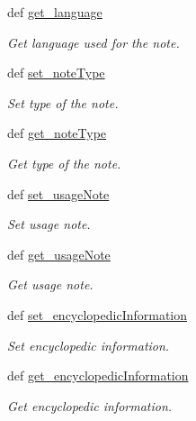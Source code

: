 \begin{DoxyCompactItemize}
def \hyperlink{classlmf_1_1src_1_1core_1_1statement_1_1_statement_aaa72b5537d3c61a7b4da16b83d99a947}{get\+\_\+language}
\begin{DoxyCompactList}\small\item\em Get language used for the note. \end{DoxyCompactList}\item 
def \hyperlink{classlmf_1_1src_1_1core_1_1statement_1_1_statement_a496622deaffb5533321e305c99ef4689}{set\+\_\+note\+Type}
\begin{DoxyCompactList}\small\item\em Set type of the note. \end{DoxyCompactList}\item 
def \hyperlink{classlmf_1_1src_1_1core_1_1statement_1_1_statement_a3d7c298b233b33d30ede48fb9c447a4c}{get\+\_\+note\+Type}
\begin{DoxyCompactList}\small\item\em Get type of the note. \end{DoxyCompactList}\item 
def \hyperlink{classlmf_1_1src_1_1core_1_1statement_1_1_statement_a457b19a604578033bd13ab3d4007ba2e}{set\+\_\+usage\+Note}
\begin{DoxyCompactList}\small\item\em Set usage note. \end{DoxyCompactList}\item 
def \hyperlink{classlmf_1_1src_1_1core_1_1statement_1_1_statement_afd49544da7d45364b4c74100ea1dfbe8}{get\+\_\+usage\+Note}
\begin{DoxyCompactList}\small\item\em Get usage note. \end{DoxyCompactList}\item 
def \hyperlink{classlmf_1_1src_1_1core_1_1statement_1_1_statement_a8f4587c26a7c775f581ca3cbf2291411}{set\+\_\+encyclopedic\+Information}
\begin{DoxyCompactList}\small\item\em Set encyclopedic information. \end{DoxyCompactList}\item 
def \hyperlink{classlmf_1_1src_1_1core_1_1statement_1_1_statement_a2c315d4fcbfec270476dc7536b48fd46}{get\+\_\+encyclopedic\+Information}
\begin{DoxyCompactList}\small\item\em Get encyclopedic information. \end{DoxyCompactList}\item 

\end{DoxyCompactItemize}
